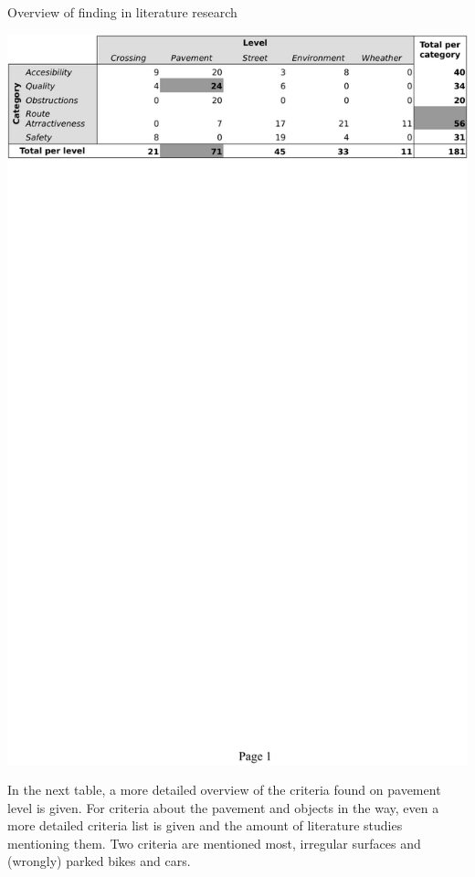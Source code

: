 \begin{table}
\caption{Overview of finding in literature research \label{literature}}
\includegraphics[width=\textwidth]{img/R_Final_overview_literature_summary.pdf}
\end{table}

In the next table, a more detailed overview of the criteria found on pavement level is given. For criteria about the pavement and objects in the way, even a more detailed criteria list is given and the amount of literature studies mentioning them. Two criteria are mentioned most, irregular surfaces and (wrongly) parked bikes and cars. 

